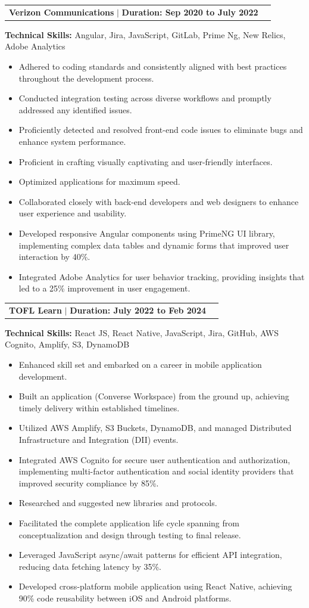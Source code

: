 \documentclass[letterpaper,10pt]{article}
\makeatletter
\newcommand{\resumeItem}[1]{
  \item\small{
    {#1 \vspace{-2pt}}
  }
}
\newcommand{\resumeProjectHeading}[2]{
    \item
    \begin{tabular*}{1.001\textwidth}{l@{\extracolsep{\fill}}r}
      \small#1 & \textbf{\small #2}\\
    \end{tabular*}\vspace{-7pt}
}
\newcommand{\resumeItemListStart}{\begin{itemize}}
\newcommand{\resumeItemListEnd}{\end{itemize}\vspace{-5pt}}
\makeatother
\begin{document}
\resumeProjectHeading
{\textbf{Verizon Communications} $|$ \textbf{Duration: Sep 2020 to July 2022}}{}
\resumeItem{\textbf{Technical Skills:} Angular, Jira, JavaScript, GitLab, Prime Ng, New Relics, Adobe Analytics}
\resumeItemListStart
\resumeItem{Adhered to coding standards and consistently aligned with best practices throughout the development process.}
\resumeItem{Conducted integration testing across diverse workflows and promptly addressed any identified issues.}
\resumeItem{Proficiently detected and resolved front-end code issues to eliminate bugs and enhance system performance.}
\resumeItem{Proficient in crafting visually captivating and user-friendly interfaces.}
\resumeItem{Optimized applications for maximum speed.}
\resumeItem{Collaborated closely with back-end developers and web designers to enhance user experience and usability.}
\resumeItem{Developed responsive Angular components using PrimeNG UI library, implementing complex data tables and dynamic forms that improved user interaction by 40\%.}
\resumeItem{Integrated Adobe Analytics for user behavior tracking, providing insights that led to a 25\% improvement in user engagement.}
\resumeItemListEnd
\vspace{6pt}
\resumeProjectHeading
{\textbf{TOFL Learn} $|$ \textbf{Duration: July 2022 to Feb 2024}} {}
\resumeItem{\textbf{Technical Skills:} React JS, React Native, JavaScript, Jira, GitHub, AWS Cognito, Amplify, S3, DynamoDB}
\resumeItemListStart
\resumeItem{Enhanced skill set and embarked on a career in mobile application development.}
\resumeItem{Built an application (Converse Workspace) from the ground up, achieving timely delivery within established timelines.}
\resumeItem{Utilized AWS Amplify, S3 Buckets, DynamoDB, and managed Distributed Infrastructure and Integration (DII) events.}
\resumeItem{Integrated AWS Cognito for secure user authentication and authorization, implementing multi-factor authentication and social identity providers that improved security compliance by 85\%.}
\resumeItem{Researched and suggested new libraries and protocols.}
\resumeItem{Facilitated the complete application life cycle spanning from conceptualization and design through testing to final release.}
\resumeItem{Leveraged JavaScript async/await patterns for efficient API integration, reducing data fetching latency by 35\%.}
\resumeItem{Developed cross-platform mobile application using React Native, achieving 90\% code reusability between iOS and Android platforms.}
\resumeItemListEnd
\end{document}
